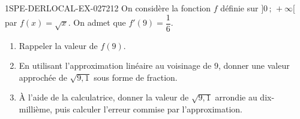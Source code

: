\begin{exercice}{1SPE-DERLOCAL-EX-027}{2}{12}
On considère la fonction $f$ définie sur $]0\,;\,+\infty[$ par $f(x) = \sqrt{x}$. On admet que $f'(9) = \dfrac{1}{6}$.

\begin{enumerate}
  \item Rappeler la valeur de $f(9)$.
  \item En utilisant l'approximation linéaire au voisinage de $9$, donner une valeur approchée de $\sqrt{9{,}1}$ sous forme de fraction.
  \item À l'aide de la calculatrice, donner la valeur de $\sqrt{9{,}1}$ arrondie au dix-millième, puis calculer l'erreur commise par l'approximation.
\end{enumerate}
\end{exercice}
